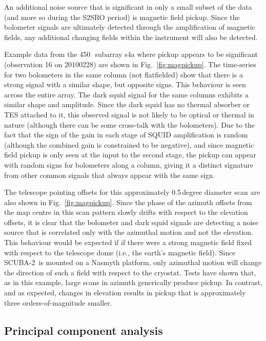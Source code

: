 \documentclass[useAMS,usenatbib,nofootinbib]{mn2e}
\newcommand{\scuba}{SCUBA-2}
\begin{document}
An additional noise source that is significant in only a small subset
of the data (and more so during the S2SRO period) is magnetic field
pickup. Since the bolometer signals are ultimately detected through
the amplification of magnetic fields, any additional changing fields
within the instrument will also be detected.

Example data from the 450\,\micron\ subarray s4a where pickup appears
to be significant (observation 16 on 20100228) are shown in
Fig.~\ref{fig:magpickup}. The time-series for two bolometers in the
same column (not flatfielded) show that there is a strong signal with
a similar shape, but opposite signs. This behaviour is seen across the
entire array. The dark squid signal for the same columns exhibits a
similar shape and amplitude. Since the dark squid has no thermal
absorber or TES attached to it, this observed signal is not likely to
be optical or thermal in nature (although there can be some cross-talk
with the bolometers). Due to the fact that the sign of the gain in
each stage of SQUID amplification is random (although the combined
gain is constrained to be negative), and since magnetic field pickup
is only seen at the input to the second stage, the pickup can appear
with random signs for bolometers along a column, giving it a distinct
signature from other common signals that always appear with the same
sign.

The telescope pointing offsets for this approximately 0.5\,degree
diameter scan are also shown in Fig.~\ref{fig:magpickup}. Since the
phase of the azimuth offsets from the map centre in this scan pattern
slowly drifts with respect to the elevation offsets, it is clear that
the bolometer and dark squid signals are detecting a noise source that
is correlated only with the azimuthal motion and not the
elevation. This behaviour would be expected if if there were a strong
magnetic field fixed with respect to the telescope dome (i.e., the
earth's magnetic field). Since \scuba\ is mounted on a Nasmyth
platform, only azimuthal motion will change the direction of such a
field with respect to the cryostat. Tests have shown that, as in this
example, large scans in azimuth generically produce pickup. In
contrast, and as expected, changes in elevation results in pickup that
is approximately three orders-of-magnitude smaller.

\subsection{Principal component analysis}
\label{sec:pca}
\end{document}
